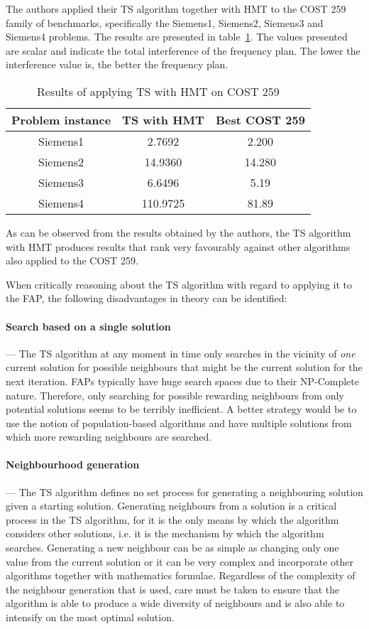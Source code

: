 The authors applied their \gls{TS} algorithm together with HMT to the \gls{COST} 259 family of benchmarks, specifically the Siemens1, Siemens2, Siemens3 and Siemens4 problems. The results are presented in table~\ref{TSCOST259}. The values presented are scalar and indicate the total interference of the frequency plan. The lower the interference value is, the better the frequency plan.
\begin{table}[H]
\centering
	\begin{tabular}{| c | c | c |}
		\hline
		Problem instance & \gls{TS} with \gls{HMT} & Best \gls{COST} 259 \\ \hline
		Siemens1 & 2.7692 & 2.200 \\ \hline
		Siemens2 & 14.9360 & 14.280 \\ \hline
		Siemens3 & 6.6496 & 5.19 \\ \hline
		Siemens4 & 110.9725 & 81.89 \\ \hline
	\end{tabular}
\caption{Results of applying \gls{TS} with \gls{HMT} on \gls{COST} 259}
\label{TSCOST259}
\end{table}
As can be observed from the results obtained by the authors, the \gls{TS} algorithm with HMT produces results that rank very favourably against other algorithms also applied to the \gls{COST} 259.

When critically reasoning about the \gls{TS} algorithm with regard to applying it to the \gls{FAP}, the following disadvantages in theory can be identified:
\paragraph{Search based on a single solution}
--- The \gls{TS} algorithm at any moment in time only searches in the vicinity of \emph{one} current solution for possible neighbours that might be the current solution for the next iteration. \gls{FAP}s typically have huge search spaces due to their NP-Complete nature. Therefore, only searching for possible rewarding neighbours from only potential solutions seems to be terribly inefficient. A better strategy would be to use the notion of population-based algorithms and have multiple solutions from which more rewarding neighbours are searched.
\paragraph{Neighbourhood generation}
--- The \gls{TS} algorithm defines no set process for generating a neighbouring solution given a starting solution. Generating neighbours from a solution is a critical process in the \gls{TS} algorithm, for it is the only means by which the algorithm considers other solutions, i.e. it is the mechanism by which the algorithm searches. Generating a new neighbour can be as simple as changing only one value from the current solution or it can be very complex and incorporate other algorithms together with mathematics formulae. Regardless of the complexity of the neighbour generation that is used, care must be taken to ensure that the algorithm is able to produce a wide diversity of neighbours and is also able to intensify on the most optimal solution.
